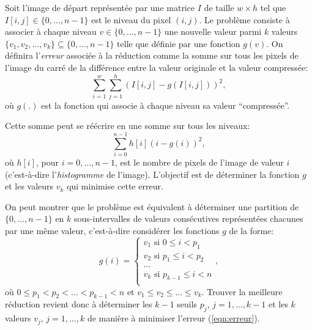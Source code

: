\documentclass[a4paper,10pt]{article}
\begin{document}
Soit l'image de départ représentée par une matrice $I$ de taille
$w\times h$ tel que $I[i,j]\in\{0,\ldots,n-1\}$ est le niveau du pixel
$(i,j)$. Le problème consiste à associer à chaque niveau $v\in
\{0,\ldots,n-1\}$ une nouvelle valeur parmi $k$ valeurs $\{v_1,
v_2,\ldots, v_k\} \subseteq \{0,\ldots, n-1\}$ telle que définie par une
fonction $g(v)$. On définira l'{\it erreur} associée à la réduction
comme la somme sur tous les pixels de l'image du carré de la
différence entre la valeur originale et la valeur compressée:
$$\sum_{i=1}^w\sum_{j=1}^h (I[i,j]-g(I[i,j]))^2,$$ où $g(.)$ est la
fonction qui associe à chaque niveau sa valeur ``compressée''.

Cette somme peut se réécrire en une somme sur tous les niveaux:
\begin{equation}\label{eqn:erreur}
\sum_{i=0}^{n-1} h[i] (i-g(i))^2,
\end{equation}
où $h[i]$, pour $i=0,\ldots,n-1$, est le nombre de pixels de l'image
de valeur $i$ (c'est-à-dire l'{\it histogramme} de l'image). L'objectif est
de déterminer la fonction $g$ et les valeurs $v_k$ qui minimise cette
erreur.

On peut montrer que le problème est équivalent à déterminer une
partition de $\{0,\ldots,n-1\}$ en $k$ sous-intervalles de valeurs
consécutives représentées chacunes par une même valeur, c'est-à-dire
considérer les fonctions $g$ de la forme:
\[
g(i)=\left\{
\begin{array}{ll}
v_1\mbox{ si }0\leq i<p_1\\
v_2\mbox{ si }p_1\leq i < p_2\\
\ldots\\
v_k\mbox{ si }p_{k-1}\leq i< n\\
\end{array}
\right.,
\]
où $0\leq p_1<p_2<\ldots<p_{k-1}<n$ et $v_1\leq v_2\leq\ldots \leq v_k$. Trouver la meilleure réduction revient
donc à déterminer les $k-1$ seuils $p_j$, $j=1,\ldots, k-1$ et les $k$
valeurs $v_j$, $j=1,\ldots,k$ de manière à minimiser l'erreur
(\ref{eqn:erreur}).
\end{document}

